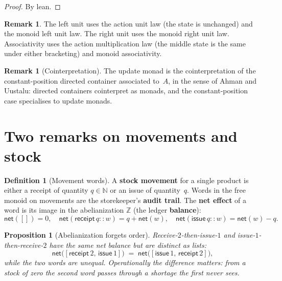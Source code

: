 \documentclass[11pt,a4paper]{article}
\theoremstyle{plain}
\newtheorem{proposition}[theorem]{Proposition}
\theoremstyle{definition}
\newtheorem{definition}[theorem]{Definition}
\newtheorem{remark}[theorem]{Remark}
\begin{document}
\begin{proof}
By lean.
\end{proof}

\begin{remark}
The left unit uses the action unit law (the state is unchanged) and the
monoid left unit law. The right unit uses the monoid right unit law.
Associativity uses the action multiplication law (the middle state is the
same under either bracketing) and monoid associativity.
\end{remark}

\begin{remark}[Cointerpretation]
The update monad is the cointerpretation of the constant-position
directed container associated to~$A$, in the sense of Ahman and Uustalu:
directed containers cointerpret as monads, and the constant-position case
specialises to update monads.
\end{remark}

\section{Two remarks on movements and stock}

\begin{definition}[Movement words]\label{def:movements}
A \textbf{stock movement} for a single product is either a receipt of
quantity $q \in \mathbb{N}$ or an issue of quantity~$q$. Words in the free
monoid on movements are the storekeeper's \textbf{audit trail}. The
\textbf{net effect} of a word is its image in the abelianization
$\mathbb{Z}$ (the ledger \textbf{balance}):
\begin{equation}
  \mathsf{net}([]) = 0,\quad
  \mathsf{net}(\mathsf{receipt}\,q :: w) = q + \mathsf{net}(w),\quad
  \mathsf{net}(\mathsf{issue}\,q :: w) = \mathsf{net}(w) - q.
\end{equation}
\end{definition}

\begin{proposition}[Abelianization forgets order]\label{prop:abelian}
Receive-$2$-then-issue-$1$ and issue-$1$-then-receive-$2$ have the same
net balance but are distinct as lists:
\begin{equation}
  \mathsf{net}\bigl([\mathsf{receipt}\,2,\, \mathsf{issue}\,1]\bigr)
  \;=\;
  \mathsf{net}\bigl([\mathsf{issue}\,1,\, \mathsf{receipt}\,2]\bigr),
\end{equation}
while the two words are unequal. Operationally the difference matters:
from a stock of zero the second word passes through a shortage the first
never sees.
\end{proposition}
\end{document}
